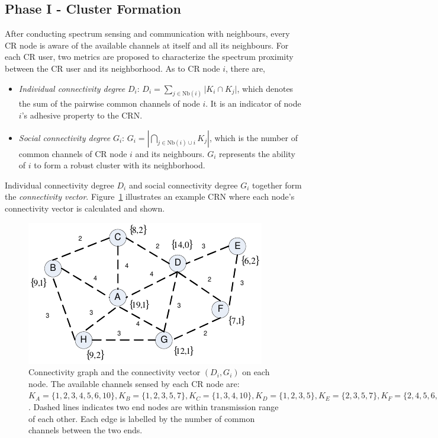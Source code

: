 \documentclass[10pt,journal,compsoc]{IEEEtran}
\theoremstyle{mytheoremstyle}
\theoremstyle{mytheoremstyle}
\theoremstyle{mytheoremstyle}
\begin{document}
\subsection{Phase I - Cluster Formation}
\label{phaseI}
After conducting spectrum sensing and communication with neighbours, every CR node is aware of the available channels at itself and all its neighbours.
For each CR user, two metrics are proposed to characterize the spectrum proximity between the CR user and its neighborhood.
As to CR node $i$, there are,
\begin{itemize}

\item \textit{Individual connectivity degree} $D_i$: $D_i=\sum_{j\in \text{Nb}(i)}\vert K_i\cap K_j\vert$, which denotes the sum of the pairwise common channels of node $i$. 
It is an indicator of node $i$'s adhesive property to the CRN. 

\item \textit{Social connectivity degree} $G_i$: $G_i=|\bigcap_{j\in \text{Nb}(i)\cup i}K_j|$, which is the number of common channels of CR node $i$ and its neighbours.
$G_i$ represents the ability of $i$ to form a robust cluster with its neighborhood.
\end{itemize}
Individual connectivity degree $D_i$ and social connectivity degree $G_i$ together form the \textit{connectivity vector}.
Figure~\ref{fig1} illustrates an example CRN where each node's connectivity vector is calculated and shown.	
\begin{figure}[ht!]
  \centering
\includegraphics[width=0.7\linewidth]{figure1.pdf}
	\caption{Connectivity graph and the connectivity vector $(D_i, G_i)$ on each node. The available channels sensed by each CR node are: $K_A=\{1,2,3,4,5,6,10\}, K_B=\{1,2,3,5,7\}, K_C=\{1,3,4,10\}, K_D=\{1,2,3,5\}, K_E=\{2,3,5,7\}, K_F=\{2,4,5,6,7\}, K_G=\{1,2,3,4,8\}, K_H=\{1,2,5,8\}$. Dashed lines indicates two end nodes are within transmission range of each other. Each edge is labelled by the number of common channels between the two ends.}
	\label{fig1}
\end{figure}
\end{document}
